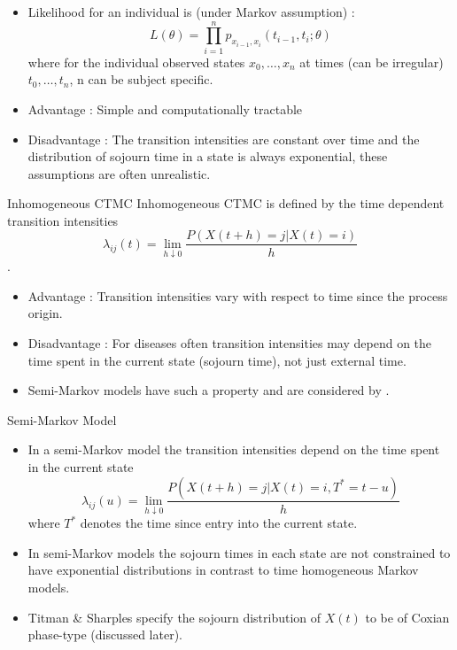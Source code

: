 \documentclass{beamer}
\begin{document}
\begin{frame}
\begin{itemize}
\item Likelihood for an individual is (under Markov  assumption) :
\[
L(\theta) = \prod_{i=1}^n p_{x_{i-1},x_i} (t_{i-1},t_i;\theta)
\] where for the individual observed states $x_0 ,\ldots, x_n$ at times (can be irregular) $t_0,\ldots,t_n$, n can be subject specific.
\end{itemize}
\end{frame}
\begin{frame}
\begin{itemize}
\item Advantage : Simple and computationally tractable
\vspace{3mm}
\item Disadvantage : The transition intensities are constant over time and the distribution of sojourn time in a state is always exponential, these assumptions are often unrealistic.
\end{itemize}
\end{frame}
\begin{frame}{Inhomogeneous CTMC}
Inhomogeneous CTMC is defined by the time dependent transition intensities \[\lambda_{ij}(t)=\lim_{h \downarrow 0} \frac{P(X(t+h)=j|X(t)=i)}{h}\].

\begin{itemize}
\item Advantage : Transition intensities vary with respect to time since the process origin.
\item Disadvantage : For diseases often transition intensities may depend on the time spent in the current state (sojourn time), not just external time.
\item Semi-Markov models have such a property and are considered by \cite{titman2010semi} \citep{cox1965theory,mcgllchrist1991semi}.
\end{itemize}
\end{frame}
\begin{frame}{Semi-Markov Model}
\begin{itemize}
\item In a semi-Markov model the transition intensities depend on the time spent in the current state
\[
\lambda_{ij} (u) = \lim_{h \downarrow 0} \frac{P(X(t+h) = j | X(t) = i, T^* = t-u)}{h}
\] where $T^*$ denotes the time since entry into the current state.
\item In semi-Markov models the sojourn times in each state are not constrained to have exponential distributions in contrast to time homogeneous Markov models. 
\item Titman \& Sharples specify the sojourn distribution of $X(t)$ to be of Coxian phase-type (discussed later).
\end{itemize}
\end{frame}
\end{document}
